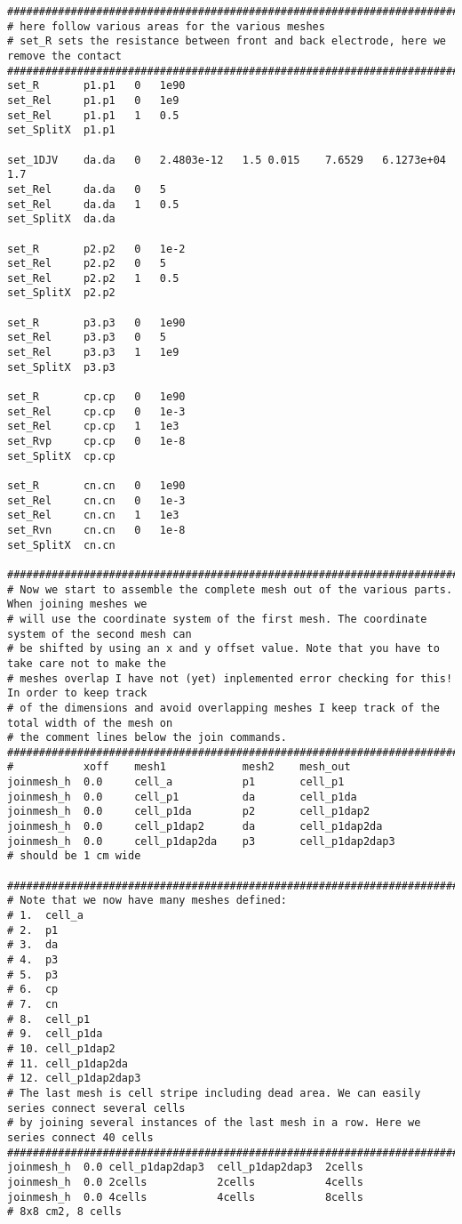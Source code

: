 \documentclass[noshowpacs,preprintnumbers,amsmath,amssymb, letter]{revtex4}
\begin{document}
\begin{small}
\begin{verbatim}
###################################################################################################
# here follow various areas for the various meshes
# set_R sets the resistance between front and back electrode, here we remove the contact
###################################################################################################
set_R       p1.p1   0   1e90
set_Rel     p1.p1   0   1e9
set_Rel     p1.p1   1   0.5
set_SplitX  p1.p1

set_1DJV    da.da   0   2.4803e-12   1.5 0.015    7.6529   6.1273e+04  1.7
set_Rel     da.da   0   5
set_Rel     da.da   1   0.5
set_SplitX  da.da
  
set_R       p2.p2   0   1e-2
set_Rel     p2.p2   0   5
set_Rel     p2.p2   1   0.5
set_SplitX  p2.p2

set_R       p3.p3   0   1e90
set_Rel     p3.p3   0   5
set_Rel     p3.p3   1   1e9
set_SplitX  p3.p3

set_R       cp.cp   0   1e90
set_Rel     cp.cp   0   1e-3
set_Rel     cp.cp   1   1e3
set_Rvp     cp.cp   0   1e-8
set_SplitX  cp.cp

set_R       cn.cn   0   1e90
set_Rel     cn.cn   0   1e-3
set_Rel     cn.cn   1   1e3
set_Rvn     cn.cn   0   1e-8
set_SplitX  cn.cn

###################################################################################################
# Now we start to assemble the complete mesh out of the various parts. When joining meshes we 
# will use the coordinate system of the first mesh. The coordinate system of the second mesh can 
# be shifted by using an x and y offset value. Note that you have to take care not to make the 
# meshes overlap I have not (yet) inplemented error checking for this! In order to keep track 
# of the dimensions and avoid overlapping meshes I keep track of the total width of the mesh on 
# the comment lines below the join commands.
###################################################################################################
#           xoff    mesh1            mesh2    mesh_out
joinmesh_h  0.0     cell_a           p1       cell_p1    
joinmesh_h  0.0     cell_p1          da       cell_p1da
joinmesh_h  0.0     cell_p1da        p2       cell_p1dap2
joinmesh_h  0.0     cell_p1dap2      da       cell_p1dap2da    
joinmesh_h  0.0     cell_p1dap2da    p3       cell_p1dap2dap3        
# should be 1 cm wide        

###################################################################################################
# Note that we now have many meshes defined:
# 1.  cell_a
# 2.  p1
# 3.  da
# 4.  p3
# 5.  p3
# 6.  cp
# 7.  cn
# 8.  cell_p1    
# 9.  cell_p1da    
# 10. cell_p1dap2
# 11. cell_p1dap2da    
# 12. cell_p1dap2dap3
# The last mesh is cell stripe including dead area. We can easily series connect several cells 
# by joining several instances of the last mesh in a row. Here we series connect 40 cells
###################################################################################################
joinmesh_h  0.0 cell_p1dap2dap3  cell_p1dap2dap3  2cells    
joinmesh_h  0.0 2cells           2cells           4cells        
joinmesh_h  0.0 4cells           4cells           8cells            
# 8x8 cm2, 8 cells



\end{verbatim}
\end{small}
\end{document}
